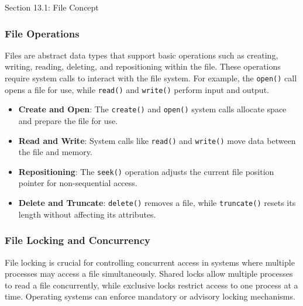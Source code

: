 \begin{notes}{Section 13.1: File Concept}
\begin{highlight}
    \end{highlight}
    
    \subsubsection*{File Operations}
    
    Files are abstract data types that support basic operations such as creating, writing, reading, deleting, and repositioning within the file. These operations require system calls to interact with the 
    file system. For example, the \texttt{open()} call opens a file for use, while \texttt{read()} and \texttt{write()} perform input and output.
    
    \begin{highlight}
    
        \begin{itemize}
            \item \textbf{Create and Open}: The \texttt{create()} and \texttt{open()} system calls allocate space and prepare the file for use.
            \item \textbf{Read and Write}: System calls like \texttt{read()} and \texttt{write()} move data between the file and memory.
            \item \textbf{Repositioning}: The \texttt{seek()} operation adjusts the current file position pointer for non-sequential access.
            \item \textbf{Delete and Truncate}: \texttt{delete()} removes a file, while \texttt{truncate()} resets its length without affecting its attributes.
        \end{itemize}
    
    \end{highlight}
    
    \subsubsection*{File Locking and Concurrency}
    
    File locking is crucial for controlling concurrent access in systems where multiple processes may access a file simultaneously. Shared locks allow multiple processes to read a file concurrently, while 
    exclusive locks restrict access to one process at a time. Operating systems can enforce mandatory or advisory locking mechanisms.
    
    \begin{highlight}
    

\end{highlight}
\end{notes}
